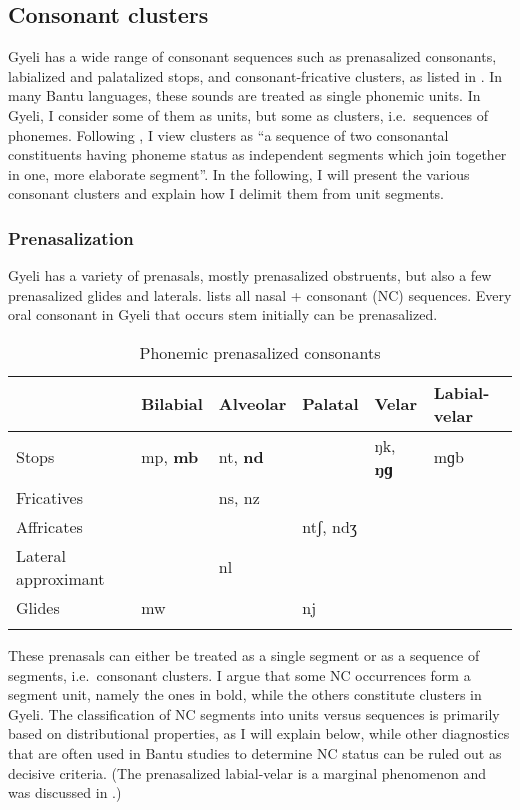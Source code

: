 \subsection{Consonant clusters}
\label{sec:CClusters}

Gyeli has a wide range of consonant sequences such as prenasalized consonants, labialized and palatalized stops, and consonant-fricative clusters, as listed in . In many Bantu languages, these sounds are treated as single phonemic units. In Gyeli, I consider some of them as units, but some as clusters, i.e.\ sequences of phonemes. Following \citet[8]{guldemann2001}, I view clusters as ``a sequence of two consonantal constituents having phoneme status as independent segments which join together in one, more elaborate segment''.  In the following, I will present the various consonant clusters and explain how I delimit them from unit segments.

\subsubsection{Prenasalization}
\label{sec:Prenasa}

Gyeli has a variety of prenasals, mostly prenasalized obstruents, but also a few prenasalized glides and laterals.   lists all nasal + consonant (NC) sequences.
Every oral consonant in Gyeli that occurs stem initially can be prenasalized.

\begin{table}
\begin{tabularx}{\textwidth}{llXlXl}
 \lsptoprule
 & Bilabial & Alveolar & Palatal & Velar & Labial-velar \\  \midrule
Stops &  {mp, {\bfseries mb}} &  {nt, {\bfseries nd}} &  &  {ŋk, {\bfseries ŋɡ}} &  {mɡb} \\
Fricatives &   &  {ns, nz} &  &  & \\
Affricates &   &  &  {ntʃ, ndʒ} &  & \\
Lateral approximant & &  {nl} & & & \\
Glides &  {mw} & &  {nj} & & \\
 \lspbottomrule
\end{tabularx}
\caption{Phonemic prenasalized consonants}
\label{Tab:Prenasalization}
\end{table}


These prenasals can either be treated as a single segment or as a sequence of segments, i.e.\ consonant clusters.  I argue that some NC occurrences form a segment unit, namely the ones in bold, while the others constitute clusters in Gyeli. The classification of NC segments into units versus sequences is primarily based on distributional properties, as I will explain below, while other diagnostics that are often used in Bantu studies to determine NC status can be ruled out as decisive criteria.  (The prenasalized labial-velar is a marginal phenomenon and was discussed in .)

